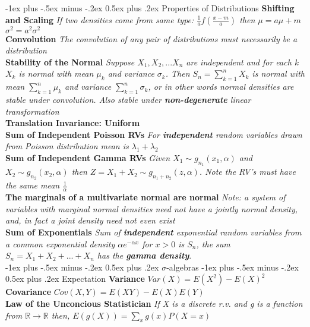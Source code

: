 \documentclass[10pt,landscape]{article}
\makeatletter
\renewcommand{\section}{\@startsection{section}{1}{0mm}%
                                {-1ex plus -.5ex minus -.2ex}%
                                {0.5ex plus .2ex}%
                                {\normalfont\large\bfseries}}
\makeatother
\begin{document}
\begin{multicols*}{3}
\section{Properties of Distributions}
\textbf{Shifting and Scaling} \textit{If two densities come from same type: $\frac{1}{a}f(\frac{x-m}{a})$ then $\mu =a\mu +m$ $\sigma^2=a^2\sigma^2$}\\
\textbf{Convolution }\textit{The convolution of any pair of distributions must necessarily be a distribution}\\
\textbf{Stability of the Normal}
\textit{Suppose $X_1,X_2,...X_n$ are independent and for each k $X_k$ is normal with mean $\mu_k$ and variance $\sigma_k$. Then $S_n = \sum_{k=1}^{n}X_k$ is normal with mean $\sum_{k=1}^{n} \mu_k$ and variance  $\sum_{k=1}^{n} \sigma_k$, or in other words normal densities are stable under convolution. Also stable under \textbf{non-degenerate} linear transformation}\\
\textbf{Translation Invariance: Uniform}\\
\textbf{Sum of Independent Poisson RVs}
\textit{For \textbf{independent} random variables drawn from Poisson distribution mean is $\lambda_1 + \lambda_2$}\\
\textbf{Sum of Independent Gamma RVs}
\textit{Given $X_1 \sim g_{n_1}(x_1,\alpha)$ and $X_2 \sim g_{n_2}(x_2,\alpha)$ then $Z=X_1+X_2 \sim g_{n_1+n_2}(z,\alpha)$. Note the RV's must have the same mean $\frac{1}{\alpha}$}\\
\textbf{The marginals of a multivariate normal are normal }\textit{Note: a system of variables with marginal normal densities need not have a jointly normal density, and, in fact a joint density need not even exist}\\
\textbf{Sum of Exponentials} \textit{Sum of \textbf{independent} exponential random variables from a common exponential density $\alpha e^{-\alpha x}$ for $x>0$ is $S_n$, the sum $S_n= X_1+X_2+...+X_n$ has the \textbf{gamma density}}.\\
\section{$\sigma$-algebras}
\section{Expectation}
\textbf{Variance} $Var(X)=E(X^2)-E(X)^2$\\
\textbf{Covariance} $Cov(X,Y)=E(XY)- E(X)E(Y)$\\
\textbf{Law of the Unconcious Statistician}
\textit{If X is a discrete r.v. and g is a function from {$\mathds{R}\rightarrow \mathds{R}$} then, $E(g(X))=\sum_{x}g(x)P(X=x)$}


\end{multicols*}
\end{document}
